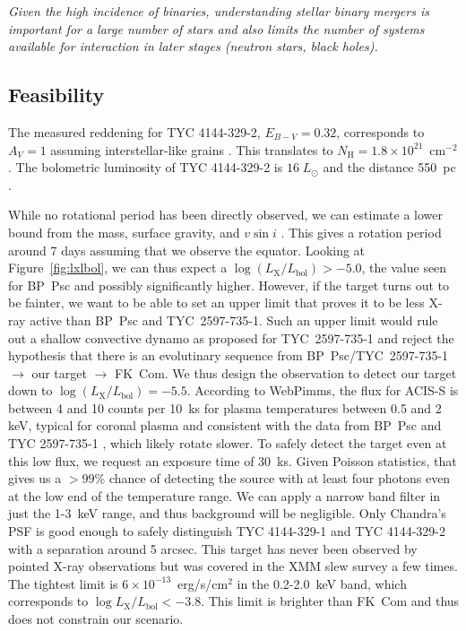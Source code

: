 \documentclass[letterpaper,11pt]{article}
\begin{document}
\textit{Given the high incidence of binaries, understanding stellar binary mergers is important for a large number of stars and also limits the number of systems available for interaction in later stages (neutron stars, black holes).}

\subsection*{Feasibility}

\vskip -0.1in
The measured reddening for TYC 4144-329-2, $E_{B-V} = 0.32$, corresponds to $A_V = 1$ assuming interstellar-like grains \cite{2009ApJ...696.1964M}. This translates to $N_\mathrm{H} = 1.8\times10^{21}$~cm$^{-2}$ \cite{1995A&A...293..889P}. The bolometric luminosity of TYC 4144-329-2 is $16\;L_\odot$ and the distance 550~pc \cite{2009ApJ...696.1964M}.

While no rotational period has been directly observed, we can estimate a lower bound from the mass, surface gravity, and $v\sin i$ \cite{2009ApJ...696.1964M}. This gives a rotation period around 7 days assuming that we observe the equator. Looking at Figure~\ref{fig:lxlbol}, we can thus expect a $\log(L_\mathrm{X}/L_\mathrm{bol}) > -5.0$, the value seen for BP~Psc and possibly significantly higher. However, if the target turns out to be fainter, we want to be able to set an upper limit that proves it to be less X-ray active than BP~Psc and TYC~2597-735-1. Such an upper limit would rule out a shallow convective dynamo as proposed for TYC~2597-735-1 and reject the hypothesis that there is an evolutinary sequence from BP~Psc/TYC~2597-735-1 $\rightarrow$ our target $\rightarrow$ FK~Com. We thus design the observation to detect our target down to  $\log(L_\mathrm{X}/L_\mathrm{bol}) = -5.5$. According to WebPimms, the flux for ACIS-S is between 4 and 10 counts per 10~ks for plasma temperatures between 0.5 and 2 keV, typical for coronal plasma and consistent with the data from BP~Psc \cite{2010ApJ...719L..65K} and TYC 2597-735-1 \cite{2022arXiv220205424G}, which likely rotate slower. To safely detect the target even at this low flux, we request an exposure time of 30~ks. Given Poisson statistics, that gives us a $>99$\% chance of detecting the source with at least four photons even at the low end of the temperature range. We can apply a narrow band filter in just the 1-3~keV range, and thus background will be negligible. Only Chandra's PSF is good enough to safely distinguish TYC 4144-329-1 and TYC 4144-329-2 with a separation around 5 arcsec. This target has never been observed by pointed X-ray observations but was covered in the XMM slew survey a few times. The tightest limit is $6\times 10^{-13}$~erg/s/cm$^2$ in the 0.2-2.0~keV band, which corresponds to $\log L_\mathrm{X}/L_\mathrm{bol} < -3.8$. This limit is brighter than FK~Com and thus does not constrain our scenario.
\end{document}
